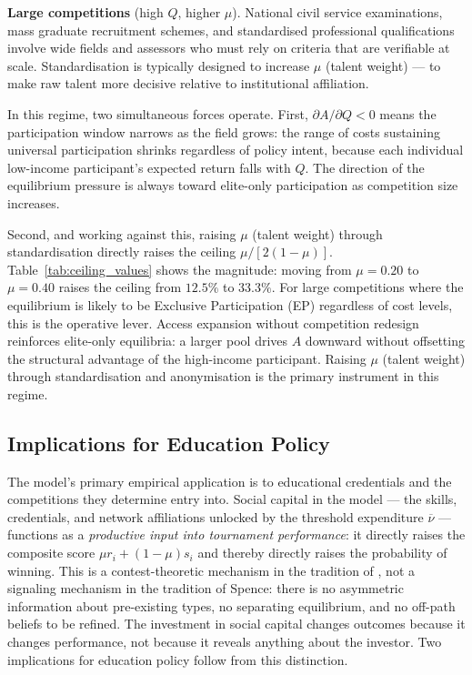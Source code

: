 \documentclass[
    oneside,
    fontsize=10pt,leqno]{article}
\begin{document}
\medskip
\noindent\textbf{Large competitions} (high $Q$, higher $\mu$).
National civil service examinations, mass graduate recruitment
schemes, and standardised professional qualifications involve wide
fields and assessors who must rely on criteria that are verifiable
at scale. Standardisation is typically designed to increase $\mu$ (talent weight)
--- to make raw talent more decisive relative to institutional
affiliation.

In this regime, two simultaneous forces operate. First,
$\partial A/\partial Q < 0$ means the participation window narrows
as the field grows: the range of costs sustaining universal
participation shrinks regardless of policy intent, because each
individual low-income participant's expected return falls with $Q$.
The direction of the equilibrium pressure is always toward
elite-only participation as competition size increases.

Second, and working against this, raising $\mu$ (talent weight) through
standardisation directly raises the ceiling $\mu/[2(1-\mu)]$.
Table~\ref{tab:ceiling_values} shows the magnitude: moving from
$\mu = 0.20$ to $\mu = 0.40$ raises the ceiling from $12.5\%$ to
$33.3\%$. For large competitions where the equilibrium is likely to
be Exclusive Participation (EP) regardless of cost levels, this is the operative lever.
Access expansion without competition redesign reinforces elite-only
equilibria: a larger pool drives $A$ downward without offsetting the
structural advantage of the high-income participant. Raising $\mu$ (talent weight)
through standardisation and anonymisation is the primary instrument
in this regime.

\subsection{Implications for Education Policy}

The model's primary empirical application is to educational credentials
and the competitions they determine entry into. Social capital in the
model --- the skills, credentials, and network affiliations unlocked by
the threshold expenditure $\overline{\nu}$ --- functions as a
\emph{productive input into tournament performance}: it directly raises
the composite score $\mu r_i + (1-\mu)s_i$ and thereby directly raises
the probability of winning. This is a contest-theoretic mechanism in the
tradition of \citet{moldovanuselacontestsstatus2007}, not a signaling
mechanism in the tradition of Spence: there is no asymmetric information
about pre-existing types, no separating equilibrium, and no off-path
beliefs to be refined. The investment in social capital changes outcomes
because it changes performance, not because it reveals anything about
the investor. Two implications for education
policy follow from this distinction.
\end{document}
